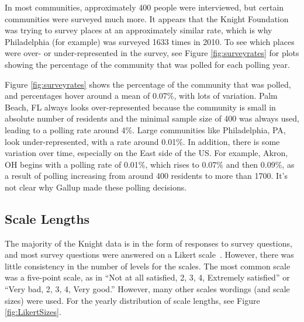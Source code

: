 \documentclass[smallextended]{svjour3}\usepackage[]{graphicx}\usepackage[]{color}
\begin{document}
In most communities, approximately 400 people were interviewed, but certain communities were surveyed much more. It appears that the Knight Foundation was trying to survey places at an approximately similar rate, which is why Philadelphia (for example) was surveyed 1633 times in 2010. To see which places were over- or under-represented in the survey, see Figure \ref{fig:surveyrates} for plots showing the percentage of the community that was polled for each polling year.

Figure \ref{fig:surveyrates} shows the percentage of the community that was polled, and percentages hover around a mean of 0.07\%, with lots of variation. Palm Beach, FL always looks over-represented because the community is small in absolute number of residents and the minimal sample size of 400 was always used, leading to a polling rate around 4\%. Large communities like Philadelphia, PA, look under-represented, with a rate around 0.01\%. In addition, there is some variation over time, especially on the East side of the US. For example, Akron, OH begins with a polling rate of 0.01\%, which rises to 0.07\% and then 0.09\%, as a result of polling increasing from around 400 residents to more than 1700. It's not clear why Gallup made these polling decisions. 

\subsection{Scale Lengths}
The majority of the Knight data is in the form of responses to survey questions, and most survey questions were answered on a Likert scale~\citep{Lik1932}. However, there was little consistency in the number of levels for the scales. The most common scale was a five-point scale, as in ``Not at all satisfied, 2, 3, 4, Extremely satisfied'' or ``Very bad, 2, 3, 4, Very good.'' However, many other scales wordings (and scale sizes) were used. For the yearly distribution of scale lengths, see Figure \ref{fig:LikertSizes}.
\end{document}
